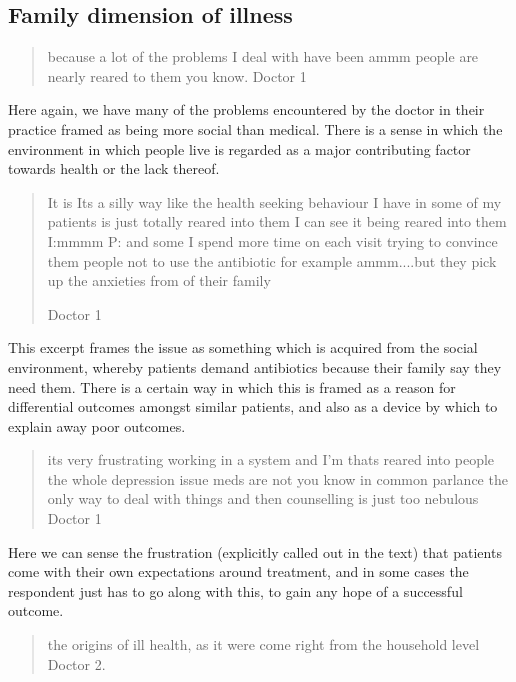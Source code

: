 \subsection{Family dimension of illness}
\label{sec:family-dimens-illn}

\begin{quotation}
  because a lot of the problems I deal with have been ammm people are nearly reared to them you know. 
Doctor 1
\end{quotation}


Here again, we have many of the problems encountered by the doctor in their practice framed as  being more social than medical. There is a sense in which the environment in which people live is regarded as a major contributing factor towards health or the lack thereof. 

\begin{quotation}
  It is Its a silly way like the health seeking behaviour I have in some of my patients is just totally reared into them I can see it being reared into them 
I:mmmm
P: and some I spend more time on each visit trying to convince them people not to use the antibiotic for example ammm....but they pick up the anxieties from of their family

Doctor 1
\end{quotation}


This excerpt frames the issue as something which is acquired from the social environment, whereby patients demand antibiotics because their family say they need them. There is a certain way in which this is framed as a reason for differential outcomes amongst similar patients, and also as a device by which to explain away poor outcomes. 

\begin{quotation}
  its very frustrating working in a system and I'm thats reared into people the whole depression issue meds are not you know in common parlance the only way to deal with things and then counselling is just too nebulous 
Doctor 1
\end{quotation}

Here we can sense the frustration (explicitly called out in the text) that patients come with their own expectations around treatment, and in some cases the respondent just has to go along with this, to gain any hope of a successful outcome. 

\begin{quotation}
   the origins of ill health, as it were come right from the household level
Doctor 2.
\end{quotation}


